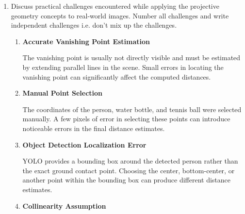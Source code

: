 \begin{enumerate}
\begin{studentSpace}
where \(AC\) is the distance between the person and the tennis ball.

Using cross-ratio invariance and assuming the vanishing point corresponds to a point at infinity, we obtain

\[
(A,B;C,\infty)
=
\frac{AC}{BC}
\]

Therefore,

\[
2.497
=
\frac{10}{BC}
\]

\[
BC \approx 4.0 \text{ ft}
\]

Thus, the estimated distance between the water bottle and the tennis ball is 4 feet.

The distance between the person and the water bottle is

\[
AB \approx 6.0 \text{ ft}
\]


Projective geometry enabled estimation of real-world distances from a single image using one known reference distance.
\end{studentSpace}

  
\item Discuss practical challenges encountered while applying the projective
geometry concepts to real-world images. Number all challenges and write independent challenges i.e. don't mix up the challenges.
\begin{studentSpace}
\begin{enumerate}

\item \textbf{Accurate Vanishing Point Estimation}

The vanishing point is usually not directly visible and must be estimated by extending parallel lines in the scene. Small errors in locating the vanishing point can significantly affect the computed distances.

\item \textbf{Manual Point Selection}

The coordinates of the person, water bottle, and tennis ball were selected manually. A few pixels of error in selecting these points can introduce noticeable errors in the final distance estimates.

\item \textbf{Object Detection Localization Error}

YOLO provides a bounding box around the detected person rather than the exact ground contact point. Choosing the center, bottom-center, or another point within the bounding box can produce different distance estimates.

\item \textbf{Collinearity Assumption}


\end{enumerate}
\end{studentSpace}
\end{enumerate}
